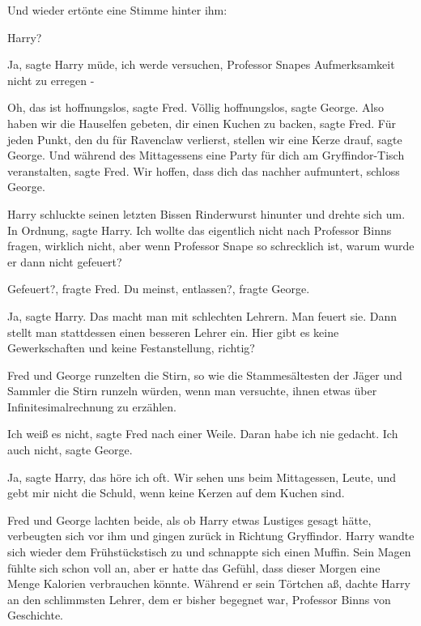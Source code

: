 Und wieder ertönte eine Stimme hinter ihm:

\glqq{}Harry?\grqq{}

\glqq{}Ja\grqq{}, sagte Harry müde, \glqq{}ich werde versuchen, Professor Snapes
Aufmerksamkeit nicht zu erregen -\grqq{}

\glqq{}Oh, das ist hoffnungslos\grqq{}, sagte Fred. \glqq{}Völlig
hoffnungslos\grqq{}, sagte George. \glqq{}Also haben wir die Hauselfen gebeten,
dir einen Kuchen zu backen\grqq{}, sagte Fred. \glqq{}Für jeden Punkt, den du für
Ravenclaw verlierst, stellen wir eine Kerze drauf\grqq{}, sagte George. \glqq{}
Und während des Mittagessens eine Party für dich am Gryffindor-Tisch
veranstalten\grqq{}, sagte Fred. \glqq{}Wir hoffen, dass dich das nachher
aufmuntert\grqq{}, schloss George.

Harry schluckte seinen letzten Bissen Rinderwurst hinunter und drehte sich um.
\glqq{}In Ordnung\grqq{}, sagte Harry. \glqq{}Ich wollte das eigentlich nicht nach
Professor Binns fragen, wirklich nicht, aber wenn Professor Snape so schrecklich
ist, warum wurde er dann nicht gefeuert?\grqq{}

\glqq{}Gefeuert?\grqq{}, fragte Fred. \glqq{}Du meinst, entlassen?\grqq{}, fragte
George.

\glqq{}Ja\grqq{}, sagte Harry. \glqq{}Das macht man mit schlechten Lehrern. Man
feuert sie. Dann stellt man stattdessen einen besseren Lehrer ein. Hier gibt es
keine Gewerkschaften und keine Festanstellung, richtig?\grqq{}

Fred und George runzelten die Stirn, so wie die Stammesältesten der Jäger und
Sammler die Stirn runzeln würden, wenn man versuchte, ihnen etwas über
Infinitesimalrechnung zu erzählen.

\glqq{}Ich weiß es nicht\grqq{}, sagte Fred nach einer Weile. \glqq{}Daran habe
ich nie gedacht.\grqq{} \glqq{}Ich auch nicht\grqq{}, sagte George.

\glqq{}Ja\grqq{}, sagte Harry, \glqq{}das höre ich oft. Wir sehen uns beim
Mittagessen, Leute, und gebt mir nicht die Schuld, wenn keine Kerzen auf dem
Kuchen sind.\grqq{}

Fred und George lachten beide, als ob Harry etwas Lustiges gesagt hätte,
verbeugten sich vor ihm und gingen zurück in Richtung Gryffindor. Harry wandte
sich wieder dem Frühstückstisch zu und schnappte sich einen Muffin. Sein Magen
fühlte sich schon voll an, aber er hatte das Gefühl, dass dieser Morgen eine
Menge Kalorien verbrauchen könnte. Während er sein Törtchen aß, dachte Harry an
den schlimmsten Lehrer, dem er bisher begegnet war, Professor Binns von
Geschichte.

